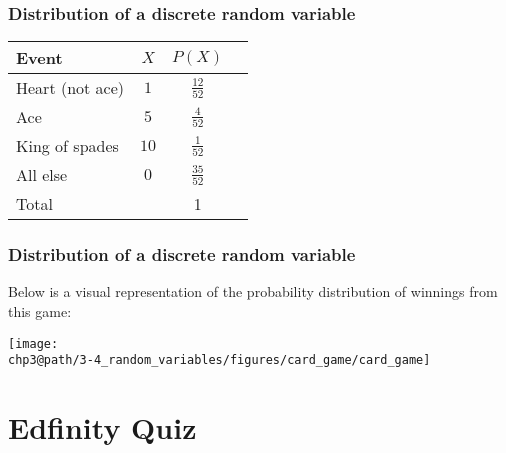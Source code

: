 \documentclass[slidestop,compress,mathserif]{beamer}
\makeatletter
\def\chp3@path{../../Chp 3}
\makeatother
\begin{document}
\begin{frame}
\frametitle{Distribution of a discrete random variable}


\pause

\begin{center}
\renewcommand{\arraystretch}{1.5}
\begin{tabular}{l | c | c | c }
Event		& $X$ 		& $P(X)$        		 \\
\hline
Heart (not ace)	& $1$		& $\frac{12}{52}$	 \\
Ace			& $5$		& $\frac{4}{52}$	 \\	
King of spades	& $10$		& $\frac{1}{52}$	 \\	
All else		& $0$		& $\frac{35}{52}$	\\
\hline
Total			&			&		1		
\end{tabular}

\end{center}

\end{frame}


\begin{frame}
\frametitle{Distribution of a discrete random variable}

Below is a visual representation of the probability distribution of winnings from this game:

\begin{center}
\texttt{[image: \\chp3@path/3-4\_random\_variables/figures/card\_game/card\_game]}
\end{center}

\end{frame}



\section{Edfinity Quiz}


\end{document}
